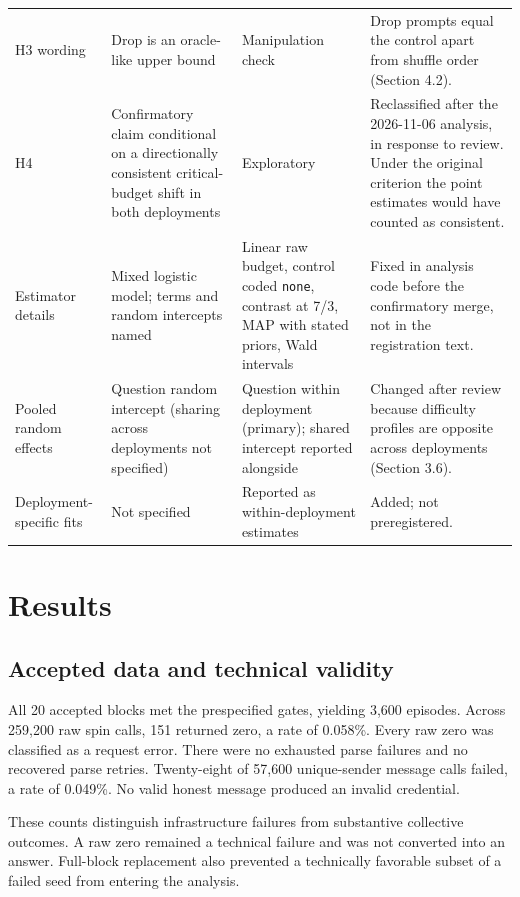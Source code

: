 \documentclass[11pt]{article}
\begin{document}
\begin{table}[htbp]
\begin{tabularx}{\textwidth}{>{\raggedright\arraybackslash}X>{\raggedright\arraybackslash}X>{\raggedright\arraybackslash}X>{\raggedright\arraybackslash}X}
H3 wording & Drop is an oracle-like upper bound & Manipulation check & Drop prompts equal the control apart from shuffle order (Section 4.2). \\
H4 & Confirmatory claim conditional on a directionally consistent critical-budget shift in both deployments & Exploratory & Reclassified after the 2026-11-06 analysis, in response to review. Under the original criterion the point estimates would have counted as consistent. \\
Estimator details & Mixed logistic model; terms and random intercepts named & Linear raw budget, control coded \texttt{none}, contrast at 7/3, MAP with stated priors, Wald intervals & Fixed in analysis code before the confirmatory merge, not in the registration text. \\
Pooled random effects & Question random intercept (sharing across deployments not specified) & Question within deployment (primary); shared intercept reported alongside & Changed after review because difficulty profiles are opposite across deployments (Section 3.6). \\
Deployment-specific fits & Not specified & Reported as within-deployment estimates & Added; not preregistered. \\
\bottomrule
\end{tabularx}
\end{table}
\FloatBarrier

\section{Results}

\subsection{Accepted data and technical validity}

All 20 accepted blocks met the prespecified gates, yielding 3,600 episodes. Across 259,200 raw spin calls, 151 returned zero, a rate of 0.058\%. Every raw zero was classified as a request error. There were no exhausted parse failures and no recovered parse retries. Twenty-eight of 57,600 unique-sender message calls failed, a rate of 0.049\%. No valid honest message produced an invalid credential.

These counts distinguish infrastructure failures from substantive collective outcomes. A raw zero remained a technical failure and was not converted into an answer. Full-block replacement also prevented a technically favorable subset of a failed seed from entering the analysis.
\end{document}
